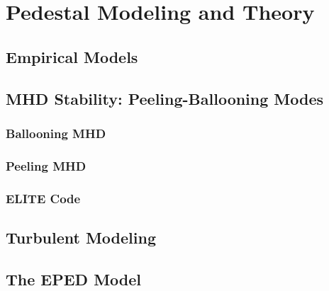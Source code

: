 \chapter{Pedestal Modeling and Theory}\label{ch:Modeling}


\section{Empirical Models}\label{sec:mod_empirical}

\nicesectionending

\section{MHD Stability: Peeling-Ballooning Modes}\label{sec:mod_pb}

\subsection{Ballooning MHD}\label{subsec:mod_balloon}

\subsection{Peeling MHD}\label{subsec:mod_peel}

\subsection{ELITE Code}\label{subsec:mod_elite}

\nicesectionending

\section{Turbulent Modeling}\label{sec:mod_turbulence}

\nicesectionending

\section{The EPED Model}\label{sec:mod_eped}

\nicechapterending


